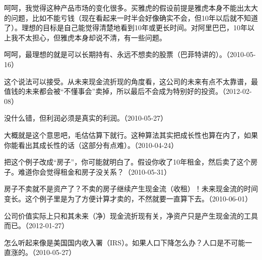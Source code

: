 
呵呵，我觉得这种产品市场的变化很多。买雅虎的假设前提是雅虎本身不能出太大的问题，比如不能亏钱（现在看起来一时半会好像确实不会，但10年以后就不知道了）。理想的目标是自己能觉得清楚地看到10年或更长时间。对阿里巴巴，10年以上我不太担心，但雅虎本身却说不清，有一些问题。

呵呵，最理想的就是可以长期持有、永远不想卖的股票（巴菲特讲的）。（2010-05-16）


这个说法可以接受。从未来现金流折现的角度看，这公司的未来有点不太靠谱，最值钱的未来都会被“不懂事会”卖掉，所以最后不会成为特别好的投资。（2012-02-08）


没什么错，但利润必须是真实的利润。（2010-05-27）


大概就是这个意思吧，毛估估算下就行。这种算法其实把成长性也算在内了，如果你能看出其成长性的话（这部分有点难）。（2010-04-24）


把这个例子改成“房子”，你可能就明白了。假设你收了10年租金，然后卖了这个房子。难道你会觉得租金和房子没关系？（2010-05-31）


房子不卖就不是资产了？不卖的房子继续产生现金流（收租）！未来现金流的时间变长。这个例子里是为了方便计算才卖的，不然就要一直算下去。（2010-06-01）

公司价值实际上只和其未来（净）现金流折现有关，净资产只是产生现金流的工具而已。（2012-01-27）


怎么听起来像是美国国内收入署（IRS）。如果人口下降怎么办？人口是不可能一直涨的。（2010-05-27）

